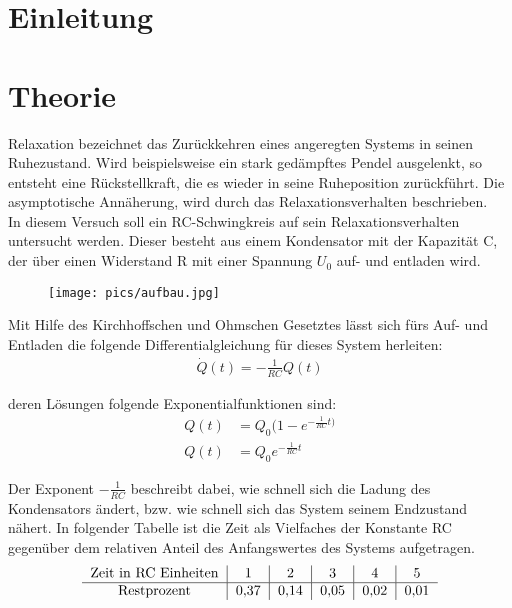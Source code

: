
\section{Einleitung}				%

\section{Theorie}

Relaxation bezeichnet das Zurückkehren eines angeregten Systems in seinen Ruhezustand. Wird  beispielsweise ein stark gedämpftes Pendel ausgelenkt, so entsteht eine Rückstellkraft, die es wieder in seine Ruheposition zurückführt. Die asymptotische Annäherung, wird durch das Relaxationsverhalten beschrieben.\\
In diesem Versuch soll ein RC-Schwingkreis auf sein Relaxationsverhalten untersucht werden. Dieser besteht aus einem Kondensator mit der Kapazität C, der über einen Widerstand R mit einer Spannung $U_0$ auf- und entladen wird.\\
\begin{figure}[htbp]
\texttt{[image: pics/aufbau.jpg]}
\centering
\end{figure}

Mit Hilfe des Kirchhoffschen und Ohmschen Gesetztes lässt sich fürs Auf- und Entladen die folgende Differentialgleichung 
für dieses System herleiten:
\begin{align}
\dot Q(t)=-\frac{1}{RC} Q(t)
\end{align}

deren Lösungen folgende Exponentialfunktionen sind:
\begin{align}
Q(t)&=Q_0(1-e^{-\frac{1}{RC}t)}\\
Q(t)&=Q_0 e^{-\frac{1}{RC}t}
\end{align}

Der Exponent $-\frac{1}{RC}$ beschreibt dabei, wie schnell sich die Ladung des Kondensators ändert, bzw. wie schnell sich das System seinem Endzustand nähert. In folgender Tabelle ist die Zeit als Vielfaches der Konstante RC gegenüber dem relativen Anteil des Anfangswertes des Systems aufgetragen.
\begin{align*}
\begin{tabular}[t]{c|c|c|c|c|c}
Zeit in RC Einheiten 	&1 &2 &3 &4 &5\\ \hline
Restprozent 			&0,37 &0,14 &0,05 &0,02 &0,01\\
\end{tabular}
\end{align*}

